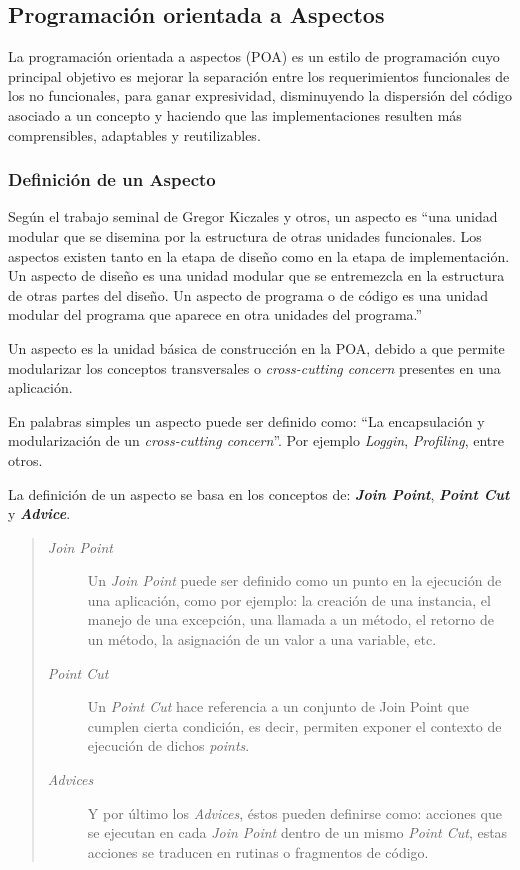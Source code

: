 \subsection{Programación orientada a Aspectos}

	La programación orientada a aspectos (POA) es un estilo de programación cuyo
	principal objetivo es mejorar la  separación entre los requerimientos
	funcionales de los no funcionales, para ganar expresividad, disminuyendo la
	dispersión del código asociado a un concepto y haciendo que las
	implementaciones resulten más comprensibles, adaptables y reutilizables.


\subsubsection{Definición de un Aspecto}
	Según el trabajo seminal de Gregor Kiczales y otros, un aspecto es 
	``una unidad modular que se disemina por la estructura de
	otras unidades funcionales. Los aspectos existen tanto en la etapa de
	diseño como en la etapa de implementación. Un aspecto de diseño es
	una unidad modular que se entremezcla en la estructura de otras partes
	del diseño. Un aspecto de programa o de código es una unidad modular
	del programa que aparece en otra unidades del programa.'' \cite{Kicz97a}

	\bigskip
	
	Un aspecto es la unidad básica de construcción en la POA, debido a que permite
	modularizar los conceptos transversales o \emph{cross-cutting concern} presentes en una aplicación.
	
	En palabras simples un aspecto puede ser definido como: ``La encapsulación y
	modularización de un \emph{cross-cutting concern}''. Por ejemplo
	\emph{Loggin}, \emph{Profiling}, entre otros.
	
	
	La definición de un aspecto se basa en los conceptos de: {\bf \emph{Join
	Point}}, {\bf \emph{ Point Cut}} y {\bf \emph{ Advice}}.
	
	\begin{quote}
	
	\begin{description}
		\item[\emph{Join Point}] Un \emph{Join Point} puede ser definido como un punto
		en la ejecución de una aplicación, como por ejemplo: la creación de una instancia, el manejo de una
		excepción, una llamada a un método, el retorno de un método, la asignación de
		un valor a una variable, etc.
		
		\item[\emph{Point Cut}] Un \emph{Point Cut} hace referencia a un conjunto de
		Join Point que cumplen cierta condición, es decir, permiten exponer el contexto de
		ejecución de dichos \emph{points}.
		
		\item[\emph{Advices}] Y por último los \emph{Advices}, éstos pueden definirse
		como: acciones que se ejecutan en cada \emph{Join Point} dentro de un mismo
		\emph{Point Cut}, estas acciones se traducen en rutinas o fragmentos de
		código.
	
	\end{description}
	\end{quote}
	
	
